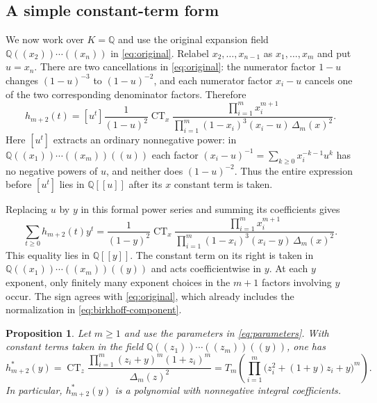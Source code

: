 \documentclass[reqno, 12pt]{article}
\numberwithin{equation}{section}
\newtheorem{proposition}[theorem]{Proposition}
\theoremstyle{definition}
\DeclareMathOperator{\CT}{CT}
\begin{document}
\subsection{A simple constant-term form}

We now work over $K=\mathbb Q$ and use the original expansion
field
$\mathbb Q((x_2))\cdots((x_n))$ in
\eqref{eq:original}.  Relabel $x_2,\ldots,x_{n-1}$ as
$x_1,\ldots,x_m$ and put $u=x_n$.  There are two cancellations
in \eqref{eq:original}: the numerator factor $1-u$ changes
$(1-u)^{-3}$ to $(1-u)^{-2}$, and each numerator factor
$x_i-u$ cancels one of the two corresponding denominator
factors.  Therefore
\begin{equation}\label{eq:original-cancelled}
h_{m+2}(t)
 =[u^t]\frac1{(1-u)^2}\CT_x
 \frac{\prod_{i=1}^m x_i^{m+1}}
      {\prod_{i=1}^m(1-x_i)^3(x_i-u)\,\Delta_m(x)^2}.
\end{equation}
Here $[u^t]$ extracts an ordinary nonnegative power: in
$\mathbb Q((x_1))\cdots((x_m))((u))$ each factor
$(x_i-u)^{-1}=\sum_{k\geq0}x_i^{-k-1}u^k$ has no negative
powers of $u$, and neither does $(1-u)^{-2}$.
Thus the entire expression before $[u^t]$ lies in
$\mathbb Q[[u]]$ after its $x$ constant term is taken.

Replacing $u$ by $y$ in this formal power series and summing its
coefficients gives
\begin{equation}\label{eq:generating-ct}
\sum_{t\geq0}h_{m+2}(t)y^t
 =\frac1{(1-y)^2}\CT_x
 \frac{\prod_{i=1}^m x_i^{m+1}}
      {\prod_{i=1}^m(1-x_i)^3(x_i-y)\,\Delta_m(x)^2}.
\end{equation}
This equality lies in $\mathbb Q[[y]]$.  The constant term on
its right is taken in $\mathbb Q((x_1))\cdots((x_m))((y))$ and acts coefficientwise
in $y$.  At each $y$ exponent, only finitely many exponent choices in the
$m+1$ factors involving $y$ occur.  The sign agrees with
\eqref{eq:original}, which already includes the normalization
in \eqref{eq:birkhoff-component}.

\begin{proposition}\label{prop:positive-ct}
Let $m\geq1$ and use the parameters in
\eqref{eq:parameters}.  With constant terms taken in the field
$\mathbb Q((z_1))\cdots((z_m))((y))$, one has
\begin{equation}\label{eq:positive-ct}
h_{m+2}^*(y)=\CT_z\frac{\prod_{i=1}^m(z_i+y)^m(1+z_i)^m}{\Delta_m(z)^2}
=T_m\left(\prod_{i=1}^m\bigl(z_i^2+(1+y)z_i+y\bigr)^m\right).
\end{equation}
In particular, $h_{m+2}^*(y)$ is a polynomial with nonnegative
integral coefficients.
\end{proposition}
\end{document}
